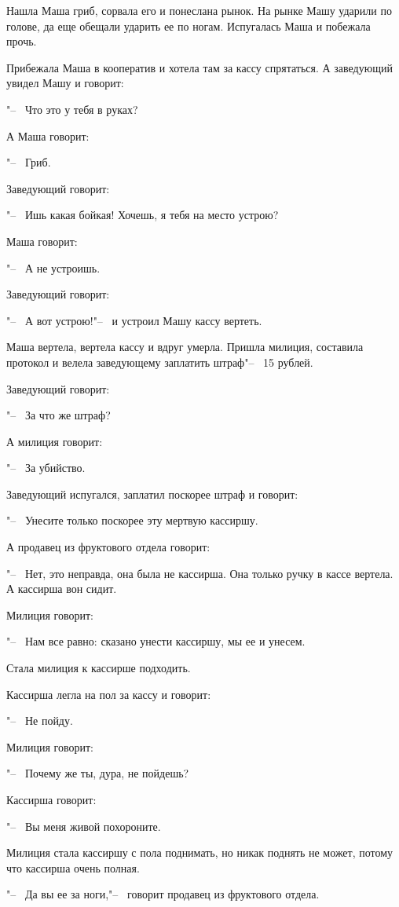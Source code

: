Нашла Маша гриб, сорвала его и понеслана рынок. На рынке Машу ударили по голове, да еще обещали ударить ее по ногам. Испугалась Маша и побежала прочь.

Прибежала Маша в кооператив и хотела там за кассу спрятаться. А заведующий увидел Машу и говорит:

"--~ Что это у тебя в руках?

А Маша говорит:

"--~ Гриб.

Заведующий говорит:

"--~ Ишь какая бойкая! Хочешь, я тебя на место устрою?

Маша говорит:

"--~ А не устроишь.

Заведующий говорит:

"--~ А вот устрою!"--~ и устроил Машу кассу вертеть.

Маша вертела, вертела кассу и вдруг умерла. Пришла милиция, составила протокол и
велела заведующему заплатить штраф"--~ 15 рублей.

Заведующий говорит:
 
"--~ За что же штраф?
 
А милиция говорит:

"--~ За убийство.
 
Заведующий испугался, заплатил поскорее штраф и говорит:
 
"--~ Унесите только поскорее эту мертвую кассиршу.
 
А продавец из фруктового отдела говорит:
 
"--~ Нет, это неправда, она была не кассирша. Она только ручку в кассе вертела. А кассирша вон сидит.
 
Милиция говорит:
 
"--~ Нам все равно: сказано унести кассиршу, мы ее и унесем.
 
Стала милиция к кассирше подходить.
 
Кассирша легла на пол за кассу и говорит:
 
"--~ Не пойду.
 
Милиция говорит:
 
"--~ Почему же ты, дура, не пойдешь?

Кассирша говорит:

"--~ Вы меня живой похороните.
 
Милиция стала кассиршу с пола поднимать, но никак поднять не может, потому что кассирша очень полная.
 
"--~ Да вы ее за ноги,"--~ говорит продавец из фруктового отдела.
 

